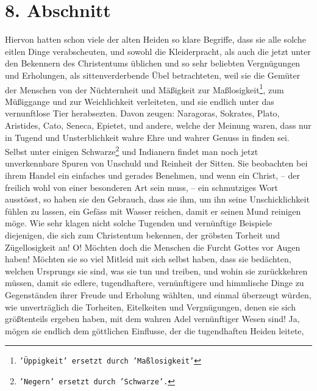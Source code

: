 \section{8. Abschnitt} \label{kap14_ab8}

Hiervon hatten schon viele der alten Heiden so klare
Begriffe, dass sie alle
solche eitlen Dinge verabscheuten, und sowohl die Kleiderpracht, als auch die
jetzt unter den Bekennern des Christentums üblichen und so sehr beliebten
Vergnügungen und Erholungen, als sittenverderbende Übel betrachteten, weil sie
die Gemüter der Menschen von der Nüchternheit und Mäßigkeit zur
Maßlosigkeit\footnote{\texttt{'Üppigkeit'
ersetzt durch 'Maßlosigkeit'}}, zum
Müßiggange und zur Weichlichkeit verleiteten, und sie
endlich
unter das
vernunftlose Tier herabsezten. Davon zeugen:
Naragoras, Sokrates,
Plato,
Aristides, Cato,
Seneca,
Epietet, und andere, welche der Meinung waren, dass nur
in
Tugend und Unsterblichkeit wahre Ehre und wahrer
Genuss in
finden sei. Selbst
unter einigen Schwarze\footnote{\texttt{'Negern' ersetzt durch 'Schwarze'.}}
 und Indianern findet man noch
jetzt unverkennbare
Spuren
von Unschuld und Reinheit der Sitten. Sie beobachten bei ihrem Handel ein
einfaches und gerades Benehmen, und wenn ein Christ, --
der freilich wohl von
einer besonderen Art sein muss, -- ein schmutziges Wort ausstösst, so haben sie
den
Gebrauch, dass sie ihm, um ihn seine Unschicklichkeit fühlen zu lassen, ein
Gefäss mit Wasser reichen, damit er seinen Mund reinigen möge. Wie sehr klagen
nicht solche Tugenden und vernünftige Beispiele diejenigen, die sich zum
Christentum bekennen, der gröbsten Torheit und Zügellosigkeit an! O! Möchten
doch die Menschen die Furcht Gottes vor Augen haben! Möchten sie so viel Mitleid
mit sich selbst haben, dass sie bedächten, welchen Ursprungs sie sind, was sie
tun und treiben, und wohin sie zurückkehren müssen, damit sie edlere,
tugendhaftere, vernünftigere und himmlische Dinge zu Gegenständen ihrer Freude
und Erholung wählten, und einmal überzeugt würden, wie unverträglich die
Torheiten, Eitelkeiten und Vergnügungen, denen sie sich größtenteils ergeben
haben, mit dem wahren Adel vernünftiger Wesen sind! Ja, mögen sie endlich dem
göttlichen Einflusse, der die tugendhaften
Heiden leitete,
